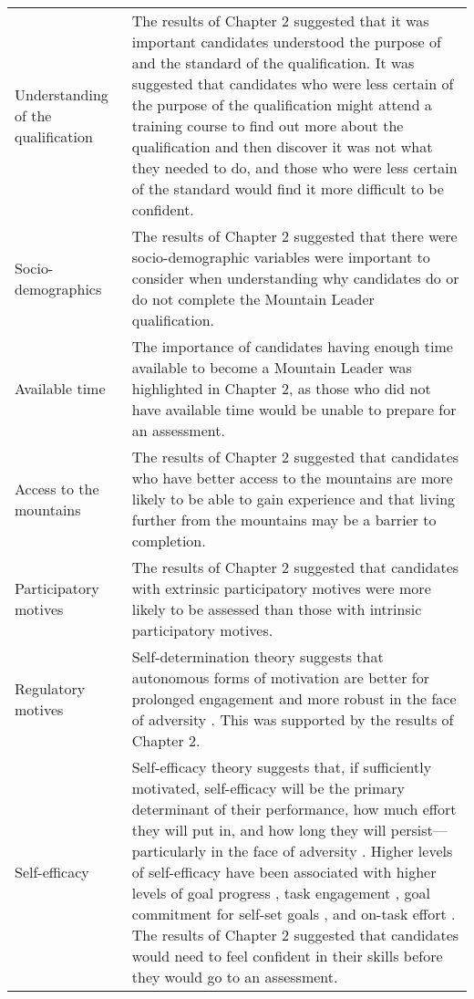\documentclass[
  12pt,
  a4paper,
]{book}
\begin{document}
\begin{landscape}
\begin{longtable}[t]{>{\raggedright\arraybackslash}p{3cm}>{\raggedright\arraybackslash}p{21cm}}
\addlinespace
Understanding of the qualification & The results of Chapter 2 suggested that it was important candidates understood the purpose of and the standard of the qualification. It was suggested that candidates who were less certain of the purpose of the qualification might attend a training course to find out more about the qualification and then discover it was not what they needed to do, and those who were less certain of the standard would find it more difficult to be confident.\\
\rowcolor{gray!6}  Socio-demographics & The results of Chapter 2 suggested that there were socio-demographic variables were important to consider when understanding why candidates do or do not complete the Mountain Leader qualification.\\
Available time & The importance of candidates having enough time available to become a Mountain Leader was highlighted in Chapter 2, as those who did not have available time would be unable to prepare for an assessment.\\
\rowcolor{gray!6}  Access to the mountains & The results of Chapter 2 suggested that candidates who have better access to the mountains are more likely to be able to gain experience and that living further from the mountains may be a barrier to completion.\\
Participatory motives & The results of Chapter 2 suggested that candidates with extrinsic participatory motives were more likely to be assessed than those with intrinsic participatory motives.\\
\addlinespace
\rowcolor{gray!6}  Regulatory motives & Self-determination theory suggests that autonomous forms of motivation are better for prolonged engagement and more robust in the face of adversity \citep{Deci1985b, Ryan2017, Ryan2019}. This was supported by the results of Chapter 2.\\
Self-efficacy & Self-efficacy theory suggests that, if sufficiently motivated, self-efficacy will be the primary determinant of their performance, how much effort they will put in, and how long they will persist—particularly in the face of adversity \citep{Bandura1977, Bandura1982, Bandura1997}. Higher levels of self-efficacy have been associated with higher levels of goal progress \citep{Sheldon1998}, task engagement \citep{Caraway2003, Walker2006}, goal commitment for self-set goals \citep{Locke1984, Locke1990}, and on-task effort \citep{Bandura1983}. The results of Chapter 2 suggested that candidates would need to feel confident in their skills before they would go to an assessment.\\

\end{longtable}
\end{landscape}
\end{document}
